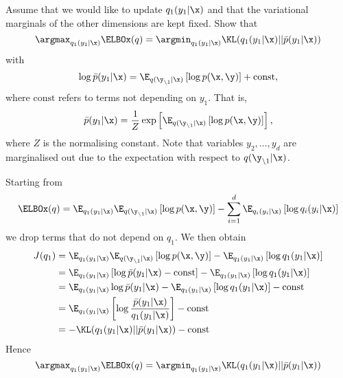 \begin{exenumerate}
\item Assume that we would like to update $q_1(y_1 |\x)$ and that the
  variational marginals of the other dimensions are kept fixed. Show that
  \begin{equation}
    \argmax_{q_1(y_1|\x)} \ELBOx(q) = \argmin_{q_1(y_1|\x)} \KL(q_1(y_1|\x) || \bar{p}(y_1|\x))
  \end{equation}
  with
\begin{equation}
  \log \bar{p}(y_1|\x) = \E_{q(\y_{\setminus 1}|\x)}\left[ \log p(\x,\y)\right] + \text{const},
\end{equation}
where $\text{const}$ refers to terms not depending on $y_1$. That is,
\begin{equation}
\bar{p}(y_1|\x) = \frac{1}{Z} \exp\left[ \E_{q(\y_{\setminus
      1}|\x)}\left[ \log p(\x,\y)\right] \right],
\end{equation}
where $Z$ is the normalising constant. Note that variables $y_2, \ldots, y_d$
are marginalised out due to the expectation with respect to $q(\y_{\setminus
  1}|\x)$.

  \begin{solution}
    Starting from 
    \begin{equation}
      \ELBOx(q) = \E_{q_1(y_1|\x)} \E_{q(\y_{\setminus 1}|\x)}\left[ \log p(\x,\y)\right] - \sum_{i=1}^d \E_{q_i(y_i|\x)} \left[\log q_i(y_i|\x)\right]
    \end{equation}
  we drop terms that do not depend on $q_1$. We then obtain
  \begin{align}
      J(q_1) & =  \E_{q_1(y_1|\x)} \E_{q(\y_{\setminus 1}|\x)}\left[ \log p(\x,\y)\right] -  \E_{q_1(y_1|\x)} \left[\log q_1(y_1|\x)\right]\\
            & =  \E_{q_1(y_1|\x)} \left[\log \bar{p}(y_1|\x) - \text{const} \right]- \E_{q_1(y_1|\x)} \left[\log q_1(y_1|\x)\right]\\
            & = \E_{q_1(y_1|\x)} \log \bar{p}(y_1|\x) - \E_{q_1(y_1|\x)} \left[\log q_1(y_1|\x)\right] - \text{const}\\
            & = \E_{q_1(y_1|\x)}\left[ \log \frac{\bar{p}(y_1|\x)}{ q_1(y_1|\x)} \right] - \text{const}\\
            & = -\KL( q_1(y_1|\x) || \bar{p}(y_1|\x) ) - \text{const}
    \end{align}
    Hence
    \begin{equation}
      \argmax_{q_1(y_1|\x)} \ELBOx(q) = \argmin_{q_1(y_1|\x)} \KL(q_1(y_1|\x) || \bar{p}(y_1|\x))
    \end{equation}
    

\end{solution}
\end{exenumerate}
